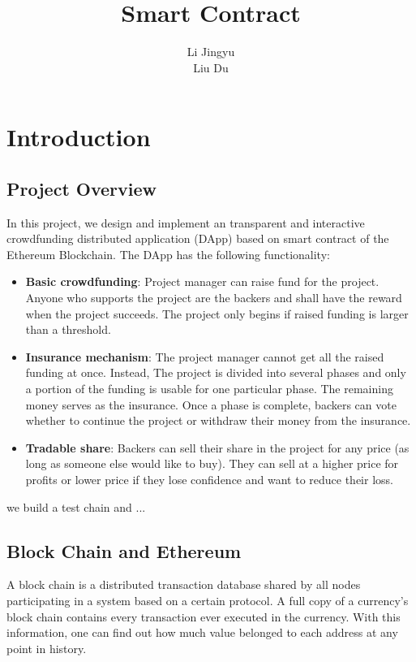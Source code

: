 \documentclass{article}
\title{Smart Contract }
\author{Li Jingyu\quad 517030910318\\Liu Du\quad 517030910346}
\begin{document}
\maketitle

\newcommand{\vecb}[2]{\boldsymbol{#1}^{(#2)}}
\newcommand{\code}[1]{{\ttfamily #1}}

\tableofcontents

\section{Introduction}

\subsection{Project Overview}
\label{sec:proj}
In this project, we design and implement an transparent and interactive crowdfunding distributed application (DApp) based on smart contract of the Ethereum Blockchain. The DApp has the following functionality:
\begin{itemize}
    \item \textbf{Basic crowdfunding}: Project manager can raise fund for the project. Anyone who supports the project are the backers and shall have the reward when the project succeeds. The project only begins if raised funding is larger than a threshold.
    \item \textbf{Insurance mechanism}: The project manager cannot get all the raised funding at once. Instead, The project is divided into several phases and only a portion of the funding is usable for one particular phase. The remaining money serves as the insurance. Once a phase is complete, backers can vote whether to continue the project or withdraw their money from the insurance.
    \item \textbf{Tradable share}: Backers can sell their share in the project for any price (as long as someone else would like to buy). They can sell at a higher price for profits or lower price if they lose confidence and want to reduce their loss.
\end{itemize}

we build a test chain and ...

\subsection{Block Chain and Ethereum}
A block chain is a distributed transaction database shared by all nodes participating in a system based on a certain protocol. A full copy of a currency's block chain contains every transaction ever executed in the currency. With this information, one can find out how much value belonged to each address at any point in history.
\end{document}
